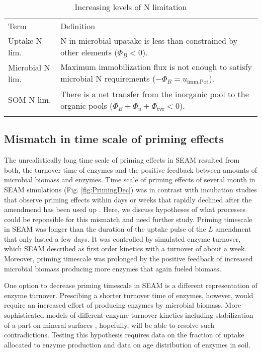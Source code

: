 \begin{table}[t]
\caption{Increasing levels of N limitation \label{tab:NutrientLimDefs}}
\centering
\begin{tabular}{lp{5.5cm}}
\tophline
Term &  Definition \\
\middlehline
Uptake N lim. & N in microbial upatake is less than 
constrained by other elements (${\Phi_B < 0}$).
\\
Microbial N lim. & Maximum immobilization flux is not enough to satisfy
microbial N requirements (${-\Phi_B =
u_{\operatorname{imm,Pot}}}$).
\\
SOM N lim. & There is a net transfer from the inorganic pool to
the organic pools (${\Phi_B+\Phi_u+\Phi_{\operatorname{tvr}}<0}$).
\\
\bottomhline
\end{tabular}
\end{table}
 


\subsection{Mismatch in time scale of priming effects}
The unrealistically long time scale of priming effects in SEAM resulted from
both, the turnover time of enzymes and the positive feedback between amounts of
microbial biomass and enzymes. Time scale of priming effects of several month in
SEAM simulations (Fig. \ref{fig:PrimingDec}) was in contrast with incubation
studies that observe priming effects within days or weeks that rapidly
declined after the amendmend has been used up \citep{Blagodatskaya14}. Here, we
discuss hypotheses of what processes could be reponsible for this mismatch and
need further study.
Priming timescale in SEAM was longer than the duration of the uptake pulse of
the $L$ amendment that only lasted a few days. It was controlled by simulated
enzyme turnover, which SEAM described as first order kinetics with a turnover of
about a week. Moreover, priming timescale was prolonged by the
positive feedback of increased microbial biomass producing more enzymes that
again fueled biomass.

One option to decrease priming timescale in SEAM is a different representation
of enzyme turnover. Prescibing a shorter turnover time of enzymes, however,
would require an increased effort of producing enzymes by microbial biomass.
More sophisticated models of different enzyme turnover kinetics including
stabilization of a part on mineral surfaces \citep{Burns13}, hopefully, will be
able to resolve such contradictions. Testing this hypothesis requires data on
the fraction of uptake allocated to enzyme production and data on age distribution
of enzymes in soil.

